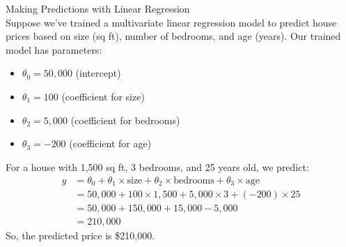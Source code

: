 \begin{example2}{Making Predictions with Linear Regression}\\
Suppose we've trained a multivariate linear regression model to predict house prices based on size (sq ft), number of bedrooms, and age (years). Our trained model has parameters:
\begin{itemize}
    \item $\theta_0 = 50,000$ (intercept)
    \item $\theta_1 = 100$ (coefficient for size)
    \item $\theta_2 = 5,000$ (coefficient for bedrooms)
    \item $\theta_3 = -200$ (coefficient for age)
\end{itemize}
\tcblower
For a house with 1,500 sq ft, 3 bedrooms, and 25 years old, we predict:
\begin{align*}
\hat{y} &= \theta_0 + \theta_1 \times \text{size} + \theta_2 \times \text{bedrooms} + \theta_3 \times \text{age} \\
&= 50,000 + 100 \times 1,500 + 5,000 \times 3 + (-200) \times 25 \\
&= 50,000 + 150,000 + 15,000 - 5,000 \\
&= 210,000
\end{align*}
So, the predicted price is \$210,000.
\end{example2}


